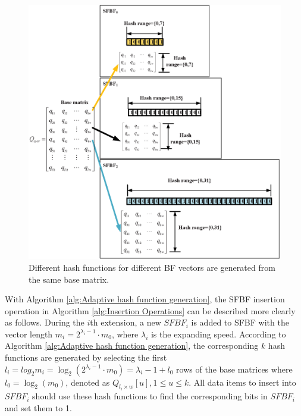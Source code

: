 \documentclass[10pt,journal,letterpaper]{IEEEtran}
\begin{document}
\begin{figure}[!h]
\centering
\includegraphics[width=3.65 in]{fig/Hash_function_generated_from_base_matrix}
\caption{Different hash functions for different BF vectors are generated from the same base matrix.}
\label{fig:Hash function generated from base matrix}
\end{figure}

With Algorithm \ref{alg:Adaptive hash function generation}, the SFBF insertion operation in Algorithm \ref{alg:Insertion Operations}
 can be described more clearly as follows.
During the $i$th extension, a new $SFBF_i$ is added to SFBF with the vector length ${m_i} = {2^{\lambda_i  - 1}} \cdot {m_0}$, where $\lambda_i$ is the  expanding speed. According to Algorithm \ref{alg:Adaptive hash function generation},
the corresponding $k$ hash functions are generated by selecting the first ${l_i} =log_2m_i= {\log _2}\left( {2^{\lambda_i  - 1}} \cdot {m_0} \right) = \lambda_i  - 1 + {l_0}$ rows of the base matrices where ${l_0} = {\log _2}\left( {{m_0}} \right)$, denoted as ${Q_{{l_i} \times w}}[u], 1 \le u \le k$. All data items to insert into $SFBF_i$ should use these hash functions to find the corresponding bits in $SFBF_i$ and set them to 1.
\end{document}
